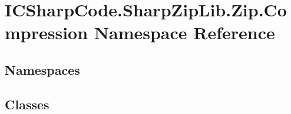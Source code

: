 \hypertarget{namespace_i_c_sharp_code_1_1_sharp_zip_lib_1_1_zip_1_1_compression}{}\section{I\+C\+Sharp\+Code.\+Sharp\+Zip\+Lib.\+Zip.\+Compression Namespace Reference}
\label{namespace_i_c_sharp_code_1_1_sharp_zip_lib_1_1_zip_1_1_compression}
\subsection*{Namespaces}
\begin{DoxyCompactItemize}
\end{DoxyCompactItemize}
\subsection*{Classes}
